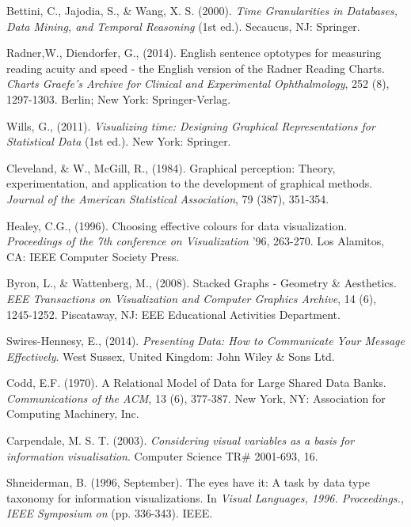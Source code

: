 \documentclass[12pt]{article}
\begin{document}
\begin{thebibliography}{1}
   Bettini, C., Jajodia, S., \& Wang, X. S. (2000). {\em Time Granularities in
Databases, Data Mining, and Temporal Reasoning} (1st ed.). Secaucus, NJ: Springer.

   Radner,W., Diendorfer, G., (2014). English sentence optotypes for measuring
reading acuity and speed - the English version of the Radner Reading Charts.
{\em Charts Graefe's Archive for Clinical and Experimental Ophthalmology}, 252 (8), 1297-1303. Berlin; New York: Springer-Verlag.

   Wills, G., (2011). {\em Visualizing time: Designing Graphical Representations
for Statistical Data} (1st ed.). New York: Springer.

   Cleveland, \& W., McGill, R., (1984). Graphical perception: Theory,
experimentation, and application to the development of graphical methods. {\em Journal of the American Statistical Association}, 79 (387), 351-354.
  
   Healey, C.G., (1996). Choosing effective colours for data visualization. {\em Proceedings of the 7th conference on Visualization} '96, 263-270. Los Alamitos, CA: IEEE Computer Society Press. 
  
   Byron, L., \& Wattenberg, M., (2008). Stacked Graphs - Geometry \&
Aesthetics. {\em EEE Transactions on Visualization and Computer Graphics Archive}, 14 (6), 1245-1252. Piscataway, NJ: EEE Educational Activities Department.

   Swires-Hennesy, E., (2014). {\em Presenting Data: How to Communicate Your Message Effectively}. West Sussex, United Kingdom: John Wiley \& Sons Ltd.
  
   Codd, E.F. (1970). A Relational Model of Data for Large Shared Data Banks.
{\em Communications of the ACM}, 13 (6), 377-387. New York, NY: Association for Computing Machinery, Inc. 

   Carpendale, M. S. T. (2003). {\em Considering visual variables as a basis for information visualisation}. Computer Science TR\# 2001-693, 16.   
  
   Shneiderman, B. (1996, September). The eyes have it: A task by data type taxonomy for information visualizations. In {\em Visual Languages, 1996. Proceedings., IEEE Symposium on } (pp. 336-343). IEEE.
  \end{thebibliography}
 
\end{document}
